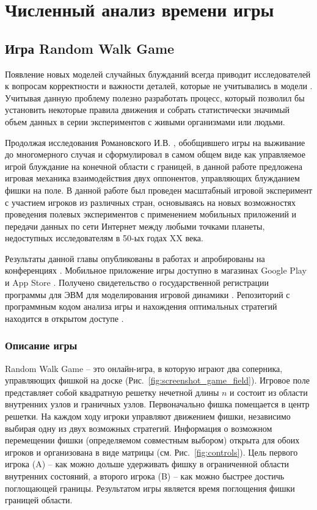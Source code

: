 \chapter{Численный анализ времени игры}\label{ch:ch3}


\section{Игра Random Walk Game}\label{sec:ch3/sec1}

Появление новых моделей случайных блужданий всегда приводит исследователей к вопросам корректности и важности деталей, которые не учитывались в модели \cite{pyke_understanding_2015, lascala-gruenewald_sensory_2019}. Учитывая данную проблему полезно разработать процесс, который позволил бы установить некоторые правила движения и собрать статистически значимый объем данных в серии экспериментов с живыми организмами или людьми. 

Продолжая исследования Романовского И.В. \cite{romanovsky_1961}, обобщившего игры на выживание до многомерного случая и сформулировал в самом общем виде как управляемое игрой блуждание на конечной области с границей, в данной работе предложена игровая механика взаимодействия двух оппонентов, управляющих блужданием фишки на поле. В данной работе был проведен масштабный игровой эксперимент с участием игроков из различных стран, основываясь на новых возможностях проведения полевых экспериментов с применением мобильных приложений и передачи данных по сети Интернет между любыми точками планеты, недоступных исследователям в 50-ых годах XX века. 

Результаты данной главы опубликованы в работах \cite{bib3,bib4} и апробированы на конференциях \cite{confbib1,confbib2}. Мобильное приложение игры доступно в магазинах Google Play \cite{googleplay} и App Store \cite{applestore}. Получено свидетельство о государственной регистрации программы для ЭВМ для моделирования игровой динамики \cite{progbib1}. Репозиторий с программным кодом анализа игры и нахождения оптимальных стратегий находится в открытом доступе \cite{RWAnalyzer}. 

\subsection{Описание игры}\label{subsec:ch3/sec1/sub1}

Random Walk Game -- это онлайн-игра, в которую играют два соперника, управляющих фишкой на доске (Рис.~\cref{fig:screenshot_game_field}). Игровое поле представляет собой квадратную решетку нечетной длины $n$ и состоит из области внутренних узлов и граничных узлов. Первоначально фишка помещается в центр решетки. На каждом ходу игроки управляют движением фишки, независимо выбирая одну из двух возможных стратегий. Информация о возможном перемещении фишки (определяемом совместным выбором) открыта для обоих игроков и организована в виде матрицы (см. Рис.~\cref{fig:controls}). Цель первого игрока (A) -- как можно дольше удерживать фишку в ограниченной области внутренних состояний, а второго игрока (B) -- как можно быстрее достичь поглощающей границы. Результатом игры является время поглощения фишки границей области.
    
